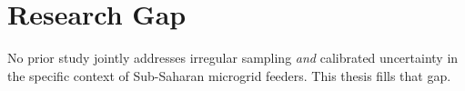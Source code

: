 \section{Research Gap}
No prior study jointly addresses irregular sampling \emph{and} calibrated uncertainty in the
specific context of Sub-Saharan microgrid feeders. This thesis fills that gap.

